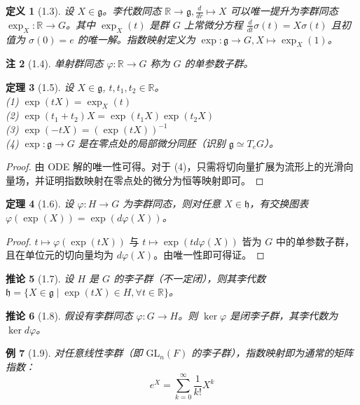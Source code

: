 \documentclass[12pt, a4paper]{ctexart}
\newtheorem{theorem}{定理}[section]
\newtheorem{corollary}[theorem]{推论}
\newtheorem{definition}[theorem]{定义}
\newtheorem{example}[theorem]{例}
\newtheorem{remark}[theorem]{注}
\begin{document}
\begin{definition}[1.3]
设 $X \in \mathfrak{g}$。李代数同态 $\mathbb{R} \to \mathfrak{g}, \frac{d}{dr} \mapsto X$ 可以唯一提升为李群同态 $\exp_X: \mathbb{R} \to G$。其中 $\exp_X(t)$ 是群 $G$ 上常微分方程 $\frac{d}{dt}\sigma(t) = X\sigma(t)$ 且初值为 $\sigma(0)=e$ 的唯一解。指数映射定义为 $\exp: \mathfrak{g} \to G, X \mapsto \exp_X(1)$。
\end{definition}

\begin{remark}[1.4]
单射群同态 $\varphi: \mathbb{R} \to G$ 称为 $G$ 的单参数子群。
\end{remark}

\begin{theorem}[1.5]
设 $X \in \mathfrak{g}$, $t, t_1, t_2 \in \mathbb{R}$。\\
(1) $\exp(tX) = \exp_X(t)$ \\
(2) $\exp(t_1 + t_2)X = \exp(t_1X) \exp(t_2X)$ \\
(3) $\exp(-tX) = (\exp(tX))^{-1}$ \\
(4) $\exp: \mathfrak{g} \to G$ 是在零点处的局部微分同胚（识别 $\mathfrak{g} \simeq T_e G$）。
\end{theorem}
\begin{proof}
由 ODE 解的唯一性可得。对于 (4)，只需将切向量扩展为流形上的光滑向量场，并证明指数映射在零点处的微分为恒等映射即可。
\end{proof}

\begin{theorem}[1.6]
设 $\varphi: H \to G$ 为李群同态，则对任意 $X \in \mathfrak{h}$，有交换图表 $\varphi(\exp(X)) = \exp(d\varphi(X))$。
\end{theorem}
\begin{proof}
$t \mapsto \varphi(\exp(tX))$ 与 $t \mapsto \exp(t d\varphi(X))$ 皆为 $G$ 中的单参数子群，且在单位元的切向量均为 $d\varphi(X)$。由唯一性即可得证。
\end{proof}

\begin{corollary}[1.7]
设 $H$ 是 $G$ 的李子群（不一定闭），则其李代数 $\mathfrak{h} = \{X \in \mathfrak{g} \mid \exp(tX) \in H, \forall t \in \mathbb{R}\}$。
\end{corollary}

\begin{corollary}[1.8]
假设有李群同态 $\varphi: G \to H$。则 $\ker \varphi$ 是闭李子群，其李代数为 $\ker d\varphi$。
\end{corollary}

\begin{example}[1.9]
对任意线性李群（即 $\mathrm{GL}_n(F)$ 的李子群），指数映射即为通常的矩阵指数：
$$ e^X = \sum_{k=0}^\infty \frac{1}{k!} X^k $$
\end{example}
\end{document}
